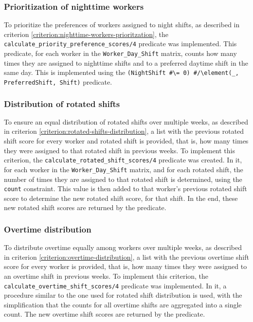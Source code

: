 \documentclass[conference]{IEEEtran}
\def\constraint#1{\vspace{4pt} {#1}}
\begin{document}
\constraint {
    \subsubsection*{Prioritization of nighttime workers}
    To prioritize the preferences of workers assigned to night shifts, as described in criterion \ref{criterion:nighttime-workers-prioritzation}, the \texttt{calculate\_priority\_preference\_scores/4} predicate was implemented. This predicate, for each worker in the \texttt{Worker\_Day\_Shift} matrix, counts how many times they are assigned to nighttime shifts and to a preferred daytime shift in the same day. This is implemented using the \texttt{(NightShift \#\textbackslash= 0) \#/\textbackslash element(\_, PreferredShift, Shift)} predicate.
}

\constraint {
    \subsubsection*{Distribution of rotated shifts}
    To ensure an equal distribution of rotated shifts over multiple weeks, as described in criterion \ref{criterion:rotated-shifts-distribution}, a list with the previous rotated shift score for every worker and rotated shift is provided, that is, how many times they were assigned to that rotated shift in previous weeks. 
    To implement this criterion, the \texttt{calculate\_rotated\_shift\_scores/4} predicate was created. In it, for each worker in the \texttt{Worker\_Day\_Shift} matrix, and for each rotated shift, the number of times they are assigned to that rotated shift is determined, using the \texttt{count} constraint. This value is then added to that worker's previous rotated shift score to determine the new rotated shift score, for that shift. In the end, these new rotated shift scores are returned by the predicate.
}


\constraint {
    \subsubsection*{Overtime distribution}
    To distribute overtime equally among workers over multiple weeks, as described in criterion \ref{criterion:overtime-distribution}, a list with the previous overtime shift score for every worker is provided, that is, how many times they were assigned to an overtime shift in previous weeks. 
    To implement this criterion, the \texttt{calculate\_overtime\_shift\_scores/4} predicate was implemented. In it, a procedure similar to the one used for rotated shift distribution is used, with the simplification that the counts for all overtime shifts are aggregated into a single count. The new overtime shift scores are returned by the predicate.
}
\end{document}
